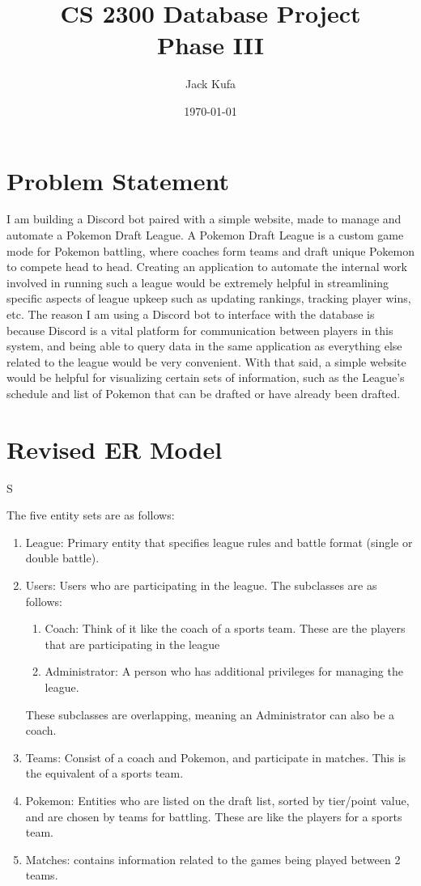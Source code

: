 \documentclass{article}
\title{CS 2300 Database Project \\ Phase III}
\author{Jack Kufa}
\date{\today}
\begin{document}
\maketitle

\section*{Problem Statement}
I am building a Discord bot paired with a simple website, made to manage and automate a Pokemon Draft League. A Pokemon Draft League is a custom game mode
for Pokemon battling, where coaches form teams and draft unique Pokemon to compete head to head. Creating an application to automate 
the internal work involved in running such a league would be extremely helpful in streamlining specific aspects of league upkeep such as updating rankings,
tracking player wins, etc. The reason I am using a Discord bot to interface with the database
is because Discord is a vital platform for communication between players in this system, and being able to query data in the same
application as everything else related to the league would be very convenient. With that said, a simple website would be helpful for visualizing certain sets of information,
such as the League's schedule and list of Pokemon that can be drafted or have already been drafted.

\section*{Revised ER Model}S

The five entity sets are as follows:
\begin{enumerate}
    \item League: Primary entity that specifies league rules and battle format (single or double battle).
    \item Users: Users who are participating in the league. The subclasses are as follows: \begin{enumerate}
        \item Coach: Think of it like the coach of a sports team. These are the players that are participating in the league
        \item Administrator: A person who has additional privileges for managing the league.
    \end{enumerate}
    These subclasses are overlapping, meaning an Administrator can also be a coach.
    \item Teams: Consist of a coach and Pokemon, and participate in matches. This is the equivalent of a sports team.
    \item Pokemon: Entities who are listed on the draft list, sorted by tier/point value, and are chosen by teams for battling. These are like the players for a sports team.
    \item Matches: contains information related to the games being played between 2 teams.
\end{enumerate}
\end{document}
